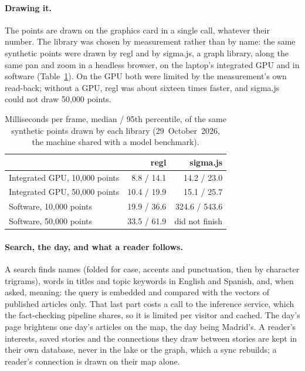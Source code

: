 \paragraph{Drawing it.} The points are drawn on the graphics card in a
single call, whatever their number. The library was chosen by
measurement rather than by name: the same synthetic points were drawn
by regl and by sigma.js, a graph library, along the same pan and zoom
in a headless browser, on the laptop's integrated GPU and in software
(Table~\ref{tab:news-map-renderers}). On the GPU both were limited by
the measurement's own read-back; without a GPU, regl was about sixteen
times faster, and sigma.js could not draw 50,000 points.

\begin{table}[h]
  \centering
  \caption{Milliseconds per frame, median / 95th percentile, of the same
  synthetic points drawn by each library (29~October~2026, the
  machine shared with a model benchmark).}
  \label{tab:news-map-renderers}
  \begin{tabular}{lrr}
    \hline
    & regl & sigma.js \\
    \hline
    Integrated GPU, 10,000 points & 8.8 / 14.1 & 14.2 / 23.0 \\
    Integrated GPU, 50,000 points & 10.4 / 19.9 & 15.1 / 25.7 \\
    Software, 10,000 points & 19.9 / 36.6 & 324.6 / 543.6 \\
    Software, 50,000 points & 33.5 / 61.9 & did not finish \\
    \hline
  \end{tabular}
\end{table}

\paragraph{Search, the day, and what a reader follows.} A search finds
names (folded for case, accents and punctuation, then by character
trigrams), words in titles and topic keywords in English and Spanish,
and, when asked, meaning: the query is embedded and compared with the
vectors of published articles only. That last part costs a call to the
inference service, which the fact-checking pipeline shares, so it is
limited per visitor and cached. The day's page brightens one day's
articles on the map, the day being Madrid's. A reader's interests,
saved stories and the connections they draw between stories are kept
in their own database, never in the lake or the graph, which a sync
rebuilds; a reader's connection is drawn on their map alone.

